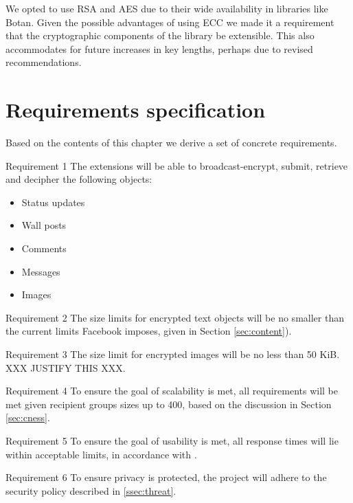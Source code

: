 We opted to use RSA and AES due to their wide availability in libraries like Botan. Given the possible advantages of using ECC we made it a requirement that the cryptographic components of the library be extensible. This also accommodates for future increases in key lengths, perhaps due to revised recommendations. 


\FloatBarrier
\section{Requirements specification}

Based on the contents of this chapter we derive a set of concrete requirements.
        
\begin{desc}

    \item[Requirement 1] The extensions will be able to broadcast-encrypt, submit, retrieve and decipher the following objects:
    
    \begin{itemize}
        \item Status updates
        \item Wall posts
        \item Comments
        \item Messages
        \item Images
    \end{itemize}
    
    \item[Requirement 2] The size limits for encrypted text objects will be no smaller than the current limits Facebook imposes, given in Section \ref{sec:content}).

    \item[Requirement 3] The size limit for encrypted images will be no less than 50 KiB. XXX JUSTIFY THIS XXX.

    \item[Requirement 4] To ensure the goal of scalability is met, all requirements will be met given recipient groups sizes up to 400, based on the discussion in Section \ref{sec:cness}.
    
    
    \item[Requirement 5] To ensure the goal of usability is met, all response times will lie within acceptable limits, in accordance with \cite{response}.


    \item[Requirement 6] To ensure privacy is protected, the project will adhere to the security policy described in \ref{ssec:threat}.



\end{desc}
